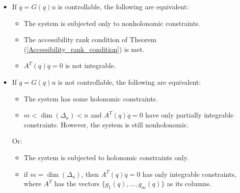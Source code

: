 \begin{itemize}
    \item If $\dot{q}=G(q)u$ is controllable, the following are equivalent: \begin{itemize}
        \item The system is subjected only to nonholonomic constraints.
        \item The accessibility rank condition of Theorem (\ref{Accessibility_rank_condition}) is met.
        \item $A^T(q)\dot{q}=0$ is not integrable.
    \end{itemize}
    \item If $\dot{q}=G(q)u$ is not controllable, the following are equivalent:
    \begin{itemize}
        \item The system has some holonomic constraints.
        \item $m<\dim(\Delta_a)<n$ and $A^T(q)\dot{q}=0$ have only partially integrable constraints. However, the system is still nonholonomic.
    \end{itemize}
    Or:
    \begin{itemize}
        \item The system is subjected to holonomic constraints only.
        \item if $m=\dim(\Delta_a)$, then $A^T(q)\dot{q}=0$ has only integrable constraints, where $A^{T}$ has the vectors $\{g_1(q),\dots,g_m(q)\}$ as its columns.
    \end{itemize}

\end{itemize}
